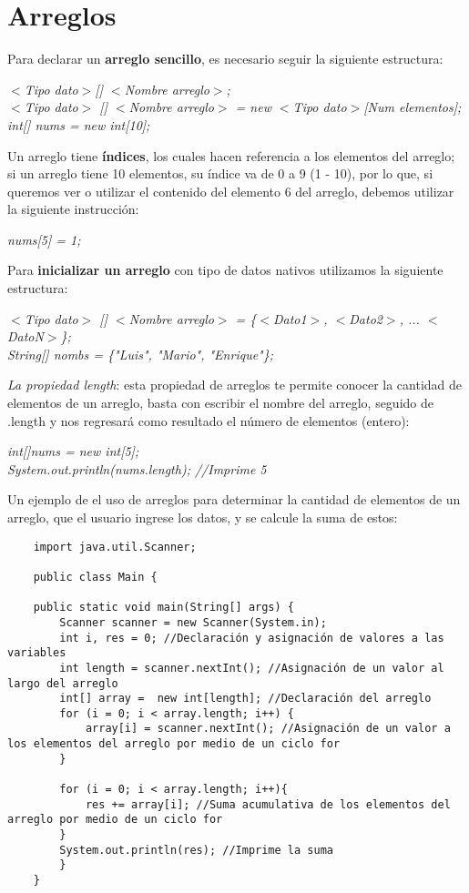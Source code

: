 \section{Arreglos}
Para declarar un \textbf{arreglo sencillo}, es necesario seguir la siguiente estructura:\begin{center}\textit{$<$Tipo dato$>$[] $<$Nombre arreglo$>$;\\$<$Tipo dato$>$ [] $<$Nombre arreglo$>$ = new $<$Tipo dato$>$[Num elementos];\\int[] nums = new int[10];}\end{center}
Un arreglo tiene \textbf{índices}, los cuales hacen referencia a los elementos del arreglo; si un arreglo tiene 10 elementos, su índice va de 0 a 9 (1 - 10), por lo que, si queremos ver o utilizar el contenido del elemento 6 del arreglo, debemos utilizar la siguiente instrucción:\begin{center}\textit{nums[5] = 1;}\end{center}
Para \textbf{inicializar un arreglo} con tipo de datos nativos utilizamos la siguiente estructura:\begin{center}\textit{$<$Tipo dato$>$ [] $<$Nombre arreglo$>$ = \{$<$Dato1$>$, $<$Dato2$>$, ... $<$DatoN$>$\};\\String[] nombs = \{"Luis", "Mario", "Enrique"\};}\end{center}
\textit{La propiedad \textit{length}}: esta propiedad de arreglos te permite conocer la cantidad de elementos de un arreglo, basta con escribir el nombre del arreglo, seguido de .length y nos regresará como resultado el número de elementos (entero):\begin{center}\textit{int[]nums = new int[5];\\System.out.println(nums.length); //Imprime 5}\end{center}
Un ejemplo de el uso de arreglos para determinar la cantidad de elementos de un arreglo, que el usuario ingrese los datos, y se calcule la suma de estos:
\begin{lstlisting}
    import java.util.Scanner;

    public class Main {

    public static void main(String[] args) {
        Scanner scanner = new Scanner(System.in);
        int i, res = 0; //Declaración y asignación de valores a las variables
        int length = scanner.nextInt(); //Asignación de un valor al largo del arreglo
        int[] array =  new int[length]; //Declaración del arreglo
        for (i = 0; i < array.length; i++) {
            array[i] = scanner.nextInt(); //Asignación de un valor a los elementos del arreglo por medio de un ciclo for
        }

        for (i = 0; i < array.length; i++){
            res += array[i]; //Suma acumulativa de los elementos del arreglo por medio de un ciclo for
        }
        System.out.println(res); //Imprime la suma
        }
    }
\end{lstlisting}

